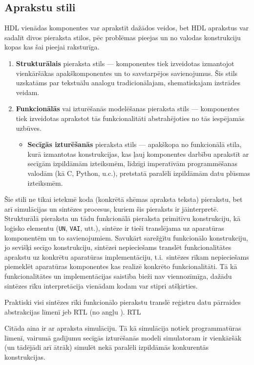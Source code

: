 \subsection{Aprakstu stili} \label{sec:hdl-styles}
HDL vienādas komponentes var aprakstīt dažādos veidos, bet
HDL aprakstus var sadalīt divos pieraksta stilos, pēc problēmas pieejas un
no valodas konstrukciju kopas kas šai pieejai raksturīga.
\begin{enumerate}
	\item \textbf{Strukturālais} pieraksta stils --- komponentes tiek
		izveidotas izmantojot vienkāršākas apakškomponentes un to savstarpējos
		savienojumus. Šis stils uzskatāms par tekstuālu analogu
		tradicionālajam, shematiskajam izstrādes veidam.
	\item \textbf{Funkcionālās} vai izturēšanās modelēšanas pieraksta
		stils --- komponentes tiek izveidotas aprakstot tās funkcionalitāti
		abstrahējoties no tās iespējamās uzbūves.
	\begin{itemize}
		\item \textbf{Secīgās izturēšanās} pieraksta stils --- apakškopa
			no funkcionālā stila, kurā izmantotas konstrukcijas, kas ļauj
			komponentes darbību aprakstīt ar secīgām izpildāmām izteiksmēm,
			līdzīgi imperatīvām programmēšanas valodām (kā C, Python, u.c.),
			pretstatā paralēli izpildāmām datu plūsmas izteiksmēm.
	\end{itemize}
\end{enumerate}

Šie stili ne tikai ietekmē koda (konkrētā shēmas apraksta teksta) pierakstu,
bet arī simulācijas un sintēzes procesus, kuriem šis pieraksts ir jāinterpretē.
Strukturālā pieraksta un tādu funkcionālā pieraksta primitīvu konstrukciju,
kā loģisko elementu (\texttt{UN}, \texttt{VAI}, utt.),
sintēze ir tieši translējama uz aparatūras komponentēm un to savienojumiem.
Savukārt sarežģītu funkcionālo konstrukciju, jo sevišķi secīgo
konstrukciju, sintēzei nepieciešams translēt funkcionalitātes aprakstu
uz konkrētu aparatūras implementāciju, t.i.~sintēzes rīkam nepieciešams
piemeklēt aparatūras komponentes kas realizē konkrēto funkcionalitāti.
Tā kā funkcionalitātes un implementācijas saistība bieži nav viennozīmīga,
dažādu sintēzes rīku interpretācija vienādam kodam var stipri atšķirties.

Praktiski visi sintēzes rīki funkcionālo pierakstu translē %
reģistru datu pārraides abstrakcijas līmenī jeb RTL
(no angļu ).\cite[2.~lpp.]{HDL}%
\cite[235.~lpp.]{Perry-VHDL}
RTL \todo


Citāda aina ir ar apraksta simulāciju. Tā kā simulācija notiek
programmatūras līmenī, vairumā gadījumu secīgās izturēšanās modeli
simulatoram ir vienkāršāk (un tādējādi arī ātrāk) simulēt nekā paralēli
izpildāmās konkurentās konstrukcijas.

